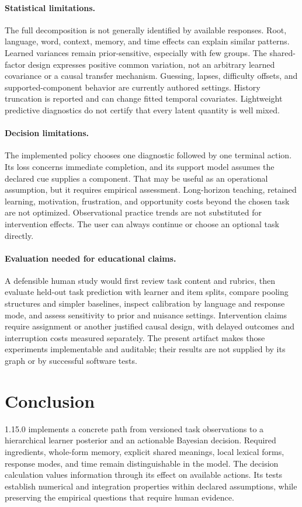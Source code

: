 \paragraph{Statistical limitations.}
The full decomposition is not generally identified by available responses.
Root, language, word, context, memory, and time effects can explain similar
patterns. Learned variances remain prior-sensitive, especially with few
groups. The shared-factor design expresses positive common variation, not an
arbitrary learned covariance or a causal transfer mechanism. Guessing,
lapses, difficulty offsets, and supported-component behavior are currently
authored settings. History truncation is reported and can change fitted
temporal covariates. Lightweight predictive diagnostics do not certify that
every latent quantity is well mixed.

\paragraph{Decision limitations.}
The implemented policy chooses one diagnostic followed by one terminal
action. Its loss concerns immediate completion, and its support model assumes
the declared cue supplies a component. That may be useful as an operational
assumption, but it requires empirical assessment. Long-horizon teaching,
retained learning, motivation, frustration, and opportunity costs beyond the
chosen task are not optimized. Observational practice trends are not
substituted for intervention effects. The user can always continue or choose
an optional task directly.

\paragraph{Evaluation needed for educational claims.}
A defensible human study would first review task content and rubrics, then
evaluate held-out task prediction with learner and item splits, compare
pooling structures and simpler baselines, inspect calibration by language and
response mode, and assess sensitivity to prior and nuisance settings.
Intervention claims require assignment or another justified causal design,
with delayed outcomes and interruption costs measured separately. The
present artifact makes those experiments implementable and auditable; their
results are not supplied by its graph or by successful software tests.

\section{Conclusion}

\Nabu{} 1.15.0 implements a concrete path from versioned task observations to
a hierarchical learner posterior and an actionable Bayesian decision.
Required ingredients, whole-form memory, explicit shared meanings, local
lexical forms, response modes, and time remain distinguishable in the model.
The decision calculation values information through its effect on available
actions. Its tests establish numerical and integration properties within
declared assumptions, while preserving the empirical questions that require
human evidence.
